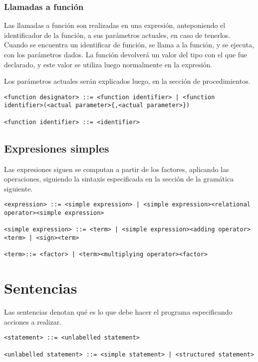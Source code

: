 \documentclass[a4paper,oneside]{report}
\begin{document}
\subsubsection{Llamadas a función}

Las llamadas a función son realizadas en una expresión, anteponiendo el identificador de la función, a sus parámetros actuales, en caso de tenerlos. Cuando se encuentra un identificar de función, se llama a la función, y se ejecuta, con los parámetros dados. La función devolverá un valor del tipo con el que fue declarado, y este valor se utiliza luego normalmente en la expresión.

Los parámetros actuales serán explicados luego, en la sección de procedimientos.

\begin{verbatim}
<function designator> ::= <function identifier> | <function identifier>(<actual parameter>{,<actual parameter>})

<function identifier> ::= <identifier>
\end{verbatim}

\subsection{Expresiones simples}

Las expresiones siguen se computan a partir de los factores, aplicando las operaciones, siguiendo la sintaxis especificada en la sección de la gramática siguiente.

\begin{verbatim}
<expression> ::= <simple expression> | <simple expression><relational operator><simple expression>

<simple expression> ::= <term> | <simple expression><adding operator><term> | <sign><term>

<term>::= <factor> | <term><multiplying operator><factor>
\end{verbatim}

\section{Sentencias}

Las sentencias denotan qué es lo que debe hacer el programa especificando acciones a realizar.

\begin{verbatim}
<statement> ::= <unlabelled statement>

<unlabelled statement> ::= <simple statement> | <structured statement>
\end{verbatim}
\end{document}
